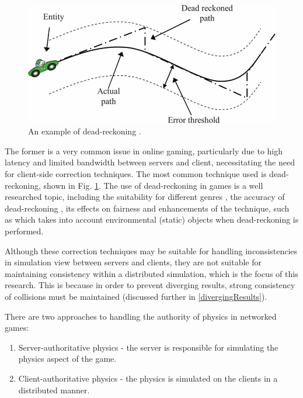 \begin{figure}
	\centering
	\includegraphics[width=\textwidth]{Figs/DeadReckoning}
	\caption{An example of dead-reckoning \cite{2012EnhancedDeadReckoning}.}
	\label{fig_DeadReckoning}
\end{figure}

The former is a very common issue in online gaming, particularly due to high latency and limited bandwidth between servers and client, necessitating the need for client-side correction techniques. The most common technique used is dead-reckoning, shown in Fig. \ref{fig_DeadReckoning}. The use of dead-reckoning in games is a well researched topic, including the suitability for different genres \cite{2002DeadReckoningSuitability}, the accuracy of dead-reckoning \cite{2004AccuracyDeadReckoning}, its effects on fairness \cite{2005FairnessDeadReckoning} and enhancements of the technique, such as \cite{2012EnhancedDeadReckoning} which takes into account environmental (static) objects when dead-reckoning is performed.

Although these correction techniques may be suitable for handling inconsistencies in simulation view between servers and clients, they are not suitable for maintaining consistency within a distributed simulation, which is the focus of this research. This is because in order to prevent diverging results, strong consistency of collisions must be maintained (discussed further in \ref{divergingResults}). 

There are two approaches to handling the authority of physics in networked games:

\begin{enumerate}
	\item Server-authoritative physics - the server is responsible for simulating the physics aspect of the game.
	\item Client-authoritative physics - the physics is simulated on the clients in a distributed manner.
\end{enumerate}

